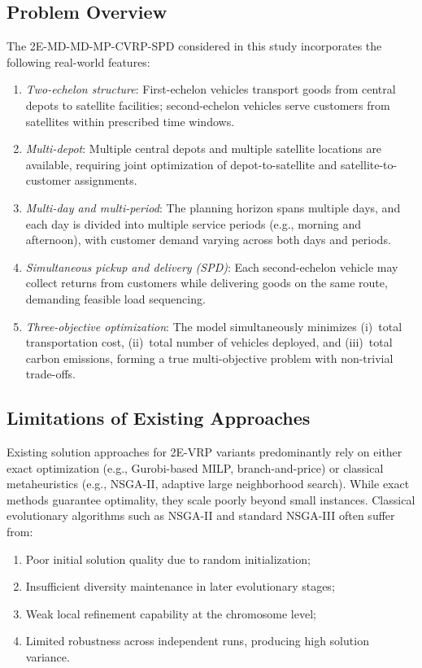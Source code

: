 \documentclass[11pt, a4paper]{article}
\numberwithin{equation}{section}
\begin{document}
\subsection{Problem Overview}

The 2E-MD-MD-MP-CVRP-SPD considered in this study incorporates the following
real-world features:
\begin{enumerate}
  \item \textit{Two-echelon structure}: First-echelon vehicles transport goods
        from central depots to satellite facilities; second-echelon vehicles
        serve customers from satellites within prescribed time windows.
  \item \textit{Multi-depot}: Multiple central depots and multiple satellite
        locations are available, requiring joint optimization of depot-to-satellite
        and satellite-to-customer assignments.
  \item \textit{Multi-day and multi-period}: The planning horizon spans multiple
        days, and each day is divided into multiple service periods
        (e.g., morning and afternoon), with customer demand varying across both
        days and periods.
  \item \textit{Simultaneous pickup and delivery (SPD)}: Each second-echelon
        vehicle may collect returns from customers while delivering goods on the
        same route, demanding feasible load sequencing.
  \item \textit{Three-objective optimization}: The model simultaneously minimizes
        (i)~total transportation cost, (ii)~total number of vehicles deployed,
        and (iii)~total carbon emissions, forming a true multi-objective problem
        with non-trivial trade-offs.
\end{enumerate}

\subsection{Limitations of Existing Approaches}

Existing solution approaches for 2E-VRP variants predominantly rely on either
exact optimization (e.g., Gurobi-based MILP, branch-and-price) or classical
metaheuristics (e.g., NSGA-II, adaptive large neighborhood search).  While
exact methods guarantee optimality, they scale poorly beyond small instances.
Classical evolutionary algorithms such as NSGA-II and standard NSGA-III often
suffer from:
\begin{enumerate}[label=(\roman*)]
  \item Poor initial solution quality due to random initialization;
  \item Insufficient diversity maintenance in later evolutionary stages;
  \item Weak local refinement capability at the chromosome level;
  \item Limited robustness across independent runs, producing high solution
        variance.
\end{enumerate}
\end{document}
